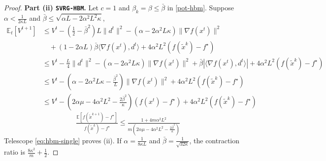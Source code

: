 \documentclass{article}
\theoremstyle{definition}
\newcommand{\sh}{\texttt{SVRG-HBM}}
\begin{document}
\begin{proof}
  \textbf{Part (ii) {\sh}.} Let $c = 1$ and $\beta_k = {\beta} \leq \bar{\beta}$ in \eqref{pot-hbm}. Suppose $\alpha
  < \tfrac{1}{2 \kappa L}$ and $\bar{\beta} \leq \sqrt{\alpha L - 2 \alpha^2
  L^2 \kappa}$,
  \begin{align*}
    \mathbb{E}_t [V^{t + 1}] &{}\leq V^t - \left( \tfrac{1}{2} -
    \bar{\beta}^2 \right) L \| d^t \|^2 - (\alpha - 2 \alpha^2 L \kappa) \|
    \nabla f (x^t) \|^2\\
    &{}\quad + (1 - 2 \alpha L) \bar{\beta} \langle \nabla f (x^t), d^t \rangle +
    4 \alpha^2 L^2 (f (\tilde{x}^k) - f^{\star})\\
    &{}\leq V^t - \tfrac{L}{4} \| d^t \|^2 - (\alpha - 2 \alpha^2 L \kappa)
    \| \nabla f (x^t) \|^2 + \bar{\beta} | \langle \nabla f (x^t), d^t \rangle
    | + 4 \alpha^2 L^2 (f (\tilde{x}^k) - f^{\star})\\
    &{}\leq V^t - \left( \alpha - 2 \alpha^2 L \kappa -
    \tfrac{\bar{\beta}^2}{L} \right) \| \nabla f (x^t) \|^2 + 4 \alpha^2 L^2
    (f (\tilde{x}^k) - f^{\star})\\
    &{}\leq V^t - \left( 2 \alpha \mu - 4 \alpha^2 L^2 - \tfrac{2
    \bar{\beta}^2}{\kappa} \right) (f (x^t) - f^{\star}) + 4 \alpha^2 L^2 (f
    (\tilde{x}^k) - f^{\star})
  \end{align*}
  \begin{equation}
    \tfrac{\mathbb{E} [f (\tilde{x}^{k + 1}) - f^{\star}]}{f (\tilde{x}^k) -
    f^{\star}} \leq \tfrac{1 + 4 m \alpha^2 L^2}{m\left( 2 \alpha \mu - 4
    \alpha^2 L^2 - \tfrac{2 \bar{\beta}^2}{\kappa} \right)}
    \label{eq:hbm-single}
  \end{equation}
  Telescope \eqref{eq:hbm-single} proves (ii). If $\alpha = \tfrac{1}{8 \kappa
  L}$ and $\bar{\beta} = \tfrac{1}{\sqrt{32 \kappa}}$, the contraction ratio
  is $\tfrac{8 \kappa^2}{m} + \tfrac{1}{2}$.
\end{proof}
\end{document}
